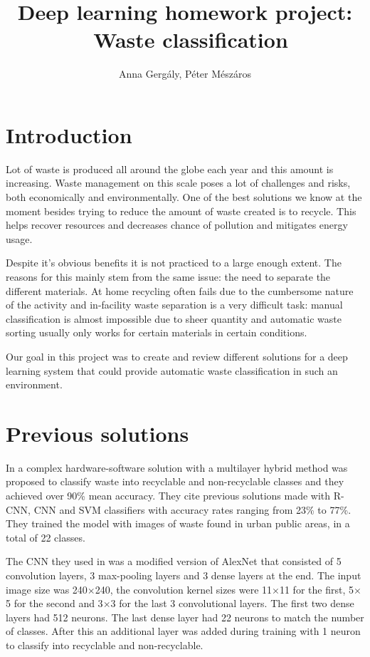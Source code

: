 \documentclass[twocolumn]{article}
\begin{document}
	\title{Deep learning homework project: \ Waste classification}
	\author{Anna Gergály, Péter Mészáros}
	\maketitle
	
	\section{Introduction}
	Lot of waste is produced all around the globe each year and this amount is increasing. Waste management on this scale poses a lot of challenges and risks, both economically and environmentally. One of the best solutions we know at the moment besides trying to reduce the amount of waste created is to recycle. This helps recover resources and decreases chance of pollution and mitigates energy usage. 
	
	Despite it's obvious benefits it is not practiced to a large enough extent. The reasons for this mainly stem from the same issue: the need to separate the different materials. At home recycling often fails due to the cumbersome nature of the activity and in-facility waste separation is a very difficult task: manual classification is almost impossible due to sheer quantity and automatic waste sorting usually only works for certain materials in certain conditions.
	
	Our goal in this project was to create and review different solutions for a deep learning system that could provide automatic waste classification in such an environment.
	
	\section{Previous solutions}\label{sec:prevsolutions}
	In \cite{Chu2018} a complex hardware-software solution with a multilayer hybrid method was proposed to classify waste into recyclable and non-recyclable classes and they achieved over 90\% mean accuracy. They cite previous solutions made with R-CNN, CNN and SVM classifiers with accuracy rates ranging from 23\% to 77\%. They trained the model with images of waste found in urban public areas, in a total of 22 classes.
	
	The CNN they used in \cite{Chu2018} was a modified version of AlexNet \cite{AlexNet} that consisted of 5 convolution layers, 3 max-pooling layers and 3 dense layers at the end. The input image size was 240$\times$240, the convolution kernel sizes were 11$\times$11 for the first, 5$\times$5 for the second and 3$\times$3 for the last 3 convolutional layers. The first two dense layers had 512 neurons. The last dense layer had 22 neurons to match the number of classes. After this an additional layer was added during training with 1 neuron to classify into recyclable and non-recyclable.
	
\end{document}
